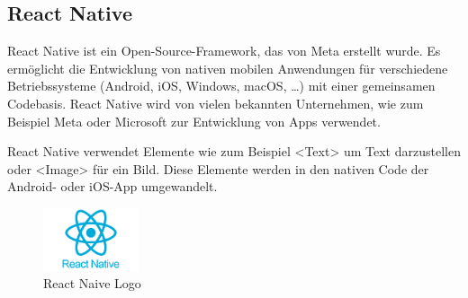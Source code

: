 \subsection{React Native}
\label{sec:reactnative}

React Native ist ein \Gls{Open-Source}-\Gls*{Framework}, das von Meta erstellt wurde. Es ermöglicht die Entwicklung von nativen mobilen Anwendungen für verschiedene Betriebssysteme (Android, iOS, Windows, macOS, …) mit einer gemeinsamen Codebasis. React Native wird von vielen bekannten Unternehmen, wie zum Beispiel Meta oder Microsoft zur Entwicklung von Apps verwendet.

\noindent React Native verwendet Elemente wie zum Beispiel <Text> um Text darzustellen oder <Image> für ein Bild. Diese Elemente werden in den nativen Code der Android- oder iOS-App umgewandelt. 

\begin{figure}[H]
    \centering
    \includegraphics[width=0.25\textwidth]{images/reactnativelogo.png}
    \caption{React Naive Logo }
    \label{fig:reactnativelogo}
\end{figure}
